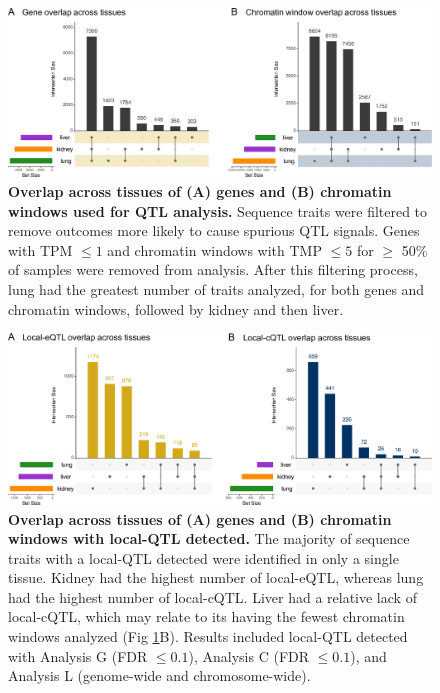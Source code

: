 \documentclass[10pt,letterpaper,twoside]{article}
\begin{document}
\clearpage

\begin{figure}[hp]
\renewcommand{\familydefault}{\sfdefault}\normalfont
\centering
\includegraphics[width=\textwidth, trim={0in 0in 0in 0in}, clip]{figs/upset_genes_chromatin.png}
\caption{\textbf{Overlap across tissues of (A) genes and (B) chromatin windows used for QTL analysis.} 
Sequence traits were filtered to remove outcomes more likely to cause spurious QTL signals. Genes with TPM $\le 1$ and chromatin windows with TMP $\le 5$ for $\ge$ 50\% of samples were removed from analysis. After this filtering process, lung had the greatest number of traits analyzed, for both genes and chromatin windows, followed by kidney and then liver. 
\label{fig:upset_genes_chromatin}}
\end{figure}

\clearpage

\begin{figure}[hp]
\renewcommand{\familydefault}{\sfdefault}\normalfont
\centering
\includegraphics[width=\textwidth, trim={0in 0in 0in 0in}, clip]{figs/upset_eqtl_cqtl.png}
\caption{\textbf{Overlap across tissues of (A) genes and (B) chromatin windows with local-QTL detected.} 
The majority of sequence traits with a local-QTL detected were identified in only a single tissue. Kidney had the highest number of local-eQTL, whereas lung had the highest number of local-cQTL. Liver had a relative lack of local-cQTL, which may relate to its having the fewest chromatin windows analyzed (Fig \ref{fig:upset_genes_chromatin}B). Results included local-QTL detected with Analysis G (FDR $\le 0.1$), Analysis C (FDR $\le 0.1$), and Analysis L (genome-wide and chromosome-wide). 
\label{fig:upset_eqtl_cqtl}}
\end{figure}
\end{document}

